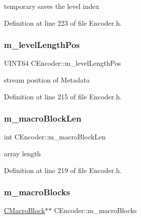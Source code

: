 temporary saves the level index 



Definition at line 223 of file Encoder.\+h.

\mbox{\label{classCEncoder_a5409bc51f3d922d43b5bcad3b8f2c8aa}} 
\subsubsection{\texorpdfstring{m\_levelLengthPos}{m\_levelLengthPos}}
{\footnotesize\ttfamily U\+I\+N\+T64 C\+Encoder\+::m\+\_\+level\+Length\+Pos\hspace{0.3cm}{\ttfamily [private]}}



stream position of Metadata 



Definition at line 215 of file Encoder.\+h.

\mbox{\label{classCEncoder_aeed23492e6a3d093c919708da3cc04d2}} 
\subsubsection{\texorpdfstring{m\_macroBlockLen}{m\_macroBlockLen}}
{\footnotesize\ttfamily int C\+Encoder\+::m\+\_\+macro\+Block\+Len\hspace{0.3cm}{\ttfamily [private]}}



array length 



Definition at line 219 of file Encoder.\+h.

\mbox{\label{classCEncoder_a6f4684ae62c14fcf22ff29e7ac8f5bc2}} 
\subsubsection{\texorpdfstring{m\_macroBlocks}{m\_macroBlocks}}
{\footnotesize\ttfamily \mbox{\hyperlink{classCEncoder_1_1CMacroBlock}{C\+Macro\+Block}}$\ast$$\ast$ C\+Encoder\+::m\+\_\+macro\+Blocks\hspace{0.3cm}{\ttfamily [private]}}



